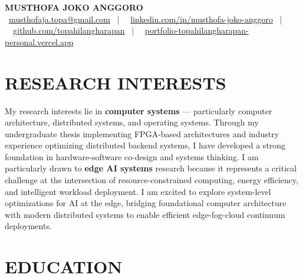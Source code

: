 \documentclass[10pt,a4paper]{article}
\newcommand{\contactline}[1]{\small #1}
\begin{document}
\begin{center}
    {\LARGE \textbf{MUSTHOFA JOKO ANGGORO}} \\[2pt]
    \contactline{
        \faEnvelope\ \href{mailto:musthofaja.topa@gmail.com}{musthofaja.topa@gmail.com} \ $|$ \ 
        \faLinkedin\ \href{https://www.linkedin.com/in/musthofa-joko-anggoro/}{linkedin.com/in/musthofa-joko-anggoro} \ $|$ \
        \faGithub\ \href{https://github.com/topahilangharapan}{github.com/topahilangharapan} \ $|$ \
        \faGlobe\ \href{https://portfolio-topahilangharapan-personal.vercel.app/}{portfolio-topahilangharapan-personal.vercel.app}
    }
\end{center}

\vspace{-10pt}

\section*{RESEARCH INTERESTS}
My research interests lie in \textbf{computer systems} — particularly computer architecture, distributed systems, and operating systems. Through my undergraduate thesis implementing FPGA-based architectures and industry experience optimizing distributed backend systems, I have developed a strong foundation in hardware-software co-design and systems thinking. I am particularly drawn to \textbf{edge AI systems} research because it represents a critical challenge at the intersection of resource-constrained computing, energy efficiency, and intelligent workload deployment. I am excited to explore system-level optimizations for AI at the edge, bridging foundational computer architecture with modern distributed systems to enable efficient edge-fog-cloud continuum deployments.

\section*{EDUCATION}
\end{document}
